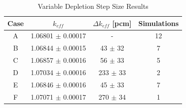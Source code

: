 \begin{table}[H]
\renewcommand{\arraystretch}{1.25}
\caption{Variable Depletion Step Size Results}
\label{tab:var-dep-step-size}
\begin{center}
\begin{tabular}{ | c | c | c | c | }
 \hline
 Case & $k_{eff}$ & $\Delta k_{eff}$ [pcm]  & Simulations\\
 \hline
 \hline
 A & 1.06801 $\pm$ 0.00017  & - & 12\\
 B & 1.06844 $\pm$ 0.00015 & 43 $\pm$ 32  & 7\\
 C & 1.06857 $\pm$ 0.00016  & 56 $\pm$ 33  & 5\\
 D & 1.07034 $\pm$ 0.00016 & 233 $\pm$ 33  & 2\\
 E & 1.06846 $\pm$ 0.00016 & 45 $\pm$ 33  & 7\\
 F & 1.07071 $\pm$ 0.00017 & 270 $\pm$ 34 & 1\\
 \hline
\end{tabular}
\end{center}
\end{table}




